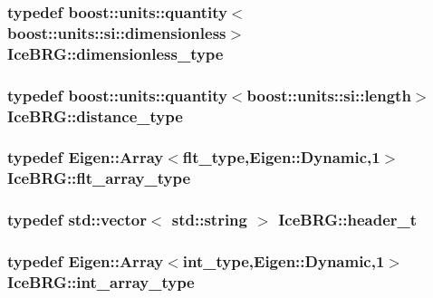 \subsubsection[{dimensionless\+\_\+type}]{\setlength{\rightskip}{0pt plus 5cm}typedef boost\+::units\+::quantity$<$boost\+::units\+::si\+::dimensionless$>$ {\bf Ice\+B\+R\+G\+::dimensionless\+\_\+type}}\label{namespaceIceBRG_a9ae604a735e60597c32674c8cd07706f}
\hypertarget{namespaceIceBRG_a45499647eb87e24c10ab32c628711cec}{}
\subsubsection[{distance\+\_\+type}]{\setlength{\rightskip}{0pt plus 5cm}typedef boost\+::units\+::quantity$<$boost\+::units\+::si\+::length$>$ {\bf Ice\+B\+R\+G\+::distance\+\_\+type}}\label{namespaceIceBRG_a45499647eb87e24c10ab32c628711cec}
\hypertarget{namespaceIceBRG_acdca5c05302480eba6ba053449643a6d}{}
\subsubsection[{flt\+\_\+array\+\_\+type}]{\setlength{\rightskip}{0pt plus 5cm}typedef Eigen\+::\+Array$<${\bf flt\+\_\+type},Eigen\+::\+Dynamic,1$>$ {\bf Ice\+B\+R\+G\+::flt\+\_\+array\+\_\+type}}\label{namespaceIceBRG_acdca5c05302480eba6ba053449643a6d}
\hypertarget{namespaceIceBRG_a49e8b48f1dbd351e9748e7cbe80705df}{}
\subsubsection[{header\+\_\+t}]{\setlength{\rightskip}{0pt plus 5cm}typedef std\+::vector$<$ std\+::string $>$ {\bf Ice\+B\+R\+G\+::header\+\_\+t}}\label{namespaceIceBRG_a49e8b48f1dbd351e9748e7cbe80705df}
\hypertarget{namespaceIceBRG_a72d4ae57531ad9188ff53d6b8ff93d32}{}
\subsubsection[{int\+\_\+array\+\_\+type}]{\setlength{\rightskip}{0pt plus 5cm}typedef Eigen\+::\+Array$<${\bf int\+\_\+type},Eigen\+::\+Dynamic,1$>$ {\bf Ice\+B\+R\+G\+::int\+\_\+array\+\_\+type}}\label{namespaceIceBRG_a72d4ae57531ad9188ff53d6b8ff93d32}
\hypertarget{namespaceIceBRG_a2d5122b3cac0d29c24c8b92645057638}{}
